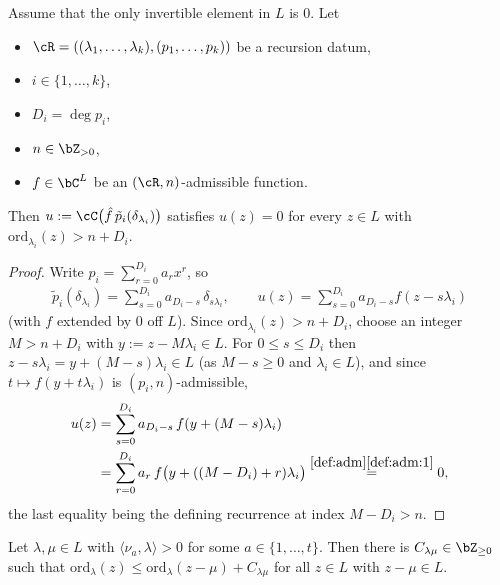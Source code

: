 \documentclass[12pt,a4paper]{amsart}%
\newcommand{\RamiB}[1]{{{#1}}}
\newcommand{\RamiE}[1]{{{#1}}}
\begin{document}
\begin{lemma}\label{lem:one-gen}
\RamiE{Assume that the only invertible element in $L$ is $0$.}
Let 
\begin{itemize}    
    \item 
    $\cR=((\lambda_1,\dots,\lambda_k),(p_1,\dots,p_k))$ be a recursion datum,
    \item \RamiB{$i\in \{1,\dots, k\}$,}
    \item $D_i=\deg p_i$, \item $n\in\Z_{>0}$,
    \item $f\in\C^L$ be an $(\cR,n)$-admissible function. 
    \end{itemize} 
    Then $u:=\cC\bigl(\hat f\,\tilde p_i(\delta_{\lambda_i})\bigr)$ satisfies $u(z)=0$ for every $z\in L$ with $\mathrm{ord}_{\lambda_i}(z)>n+D_i$.
\end{lemma}
\begin{proof}
    Write $p_i=\sum_{r=0}^{D_i}a_r x^r$, so
    \begin{align*}
    \tilde p_i(\delta_{\lambda_i})=\sum_{s=0}^{D_i}a_{D_i-s}\,\delta_{s\lambda_i},\qquad
    u(z)=\sum_{s=0}^{D_i}a_{D_i-s}f(z-s\lambda_i)
    \end{align*}
    (with $f$ extended by $0$ off $L$). Since $\mathrm{ord}_{\lambda_i}(z)>n+D_i$, choose an integer $M>n+D_i$ with $y:=z-M\lambda_i\in L$. For $0\leq s\leq D_i$ then $z-s\lambda_i=y+(M-s)\lambda_i\in L$ (as $M-s\geq0$ and $\lambda_i\in L$), and since $t\mapsto f(y+t\lambda_i)$ is $(p_i,n)$-admissible,
    \begin{align*}
    u(z)&=\sum_{s=0}^{D_i}a_{D_i-s}\,f(y+(M-s)\lambda_i)\\
    &=\sum_{r=0}^{D_i}a_r\,f\bigl(y+((M-D_i)+r)\lambda_i\bigr)
    \overset{\ref{def:adm}\eqref{def:adm:1}}{=}0,
    \end{align*}
    the last equality being the defining recurrence at index $M-D_i>n$.
\end{proof}
\begin{lemma}\label{lem:reentry}
    Let $\RamiB{\lambda,\mu\in L}$ with $\langle\nu_a,\RamiB{\lambda}\rangle>0$ for some $a\RamiB{\in \{1,\dots, t\}}$. Then there is $\RamiB{C_{\lambda\mu}}\in\Z_{\geq0}$ such that $\mathrm{ord}_{\RamiB{\lambda}}(z)\leq\mathrm{ord}_{\RamiB{\lambda}}(z-\RamiB{\mu})+\RamiB{C_{\lambda\mu}}$ for all $z\in L$ with $z-\RamiB{\mu}\in L$.
\end{lemma}
\end{document}
